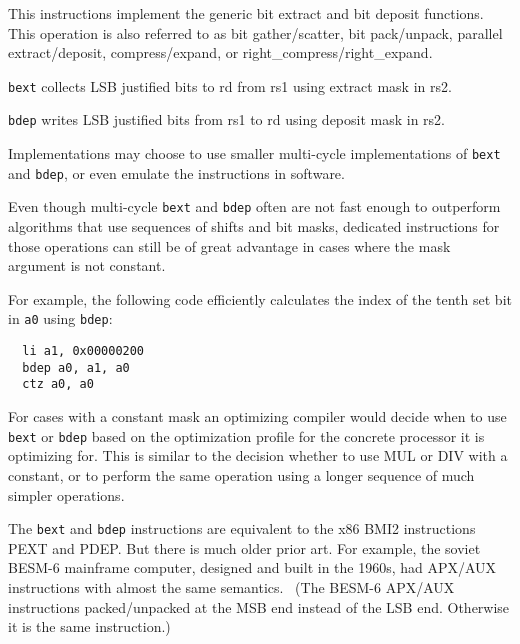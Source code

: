 This instructions implement the generic bit extract and bit deposit functions.
This operation is also referred to as bit gather/scatter, bit pack/unpack,
parallel extract/deposit, compress/expand, or right\_compress/right\_expand.

\texttt{bext} collects LSB justified bits to rd from rs1 using extract mask in rs2.

\texttt{bdep} writes LSB justified bits from rs1 to rd using deposit mask in rs2.



Implementations may choose to use smaller multi-cycle implementations of
\texttt{bext} and \texttt{bdep}, or even emulate the instructions in software.

Even though multi-cycle \texttt{bext} and \texttt{bdep} often are not fast
enough to outperform algorithms that use sequences of shifts and bit masks,
dedicated instructions for those operations can still be of great advantage in
cases where the mask argument is not constant.

For example, the following code efficiently calculates the index of the tenth
set bit in {\tt a0} using \texttt{bdep}:

\begin{minipage}{\linewidth}
\begin{verbatim}
  li a1, 0x00000200
  bdep a0, a1, a0
  ctz a0, a0
\end{verbatim}
\end{minipage}

For cases with a constant mask an optimizing compiler would decide when to use
\texttt{bext} or \texttt{bdep} based on the optimization profile for the
concrete processor it is optimizing for. This is similar to the decision
whether to use MUL or DIV with a constant, or to perform the same operation
using a longer sequence of much simpler operations.

The \texttt{bext} and \texttt{bdep} instructions are equivalent to the x86 BMI2
instructions PEXT and PDEP. But there is much older prior art. For example, the
soviet BESM-6 mainframe computer, designed and built in the 1960s, had APX/AUX
instructions with almost the same semantics.~\cite{BESM6} (The BESM-6 APX/AUX
instructions packed/unpacked at the MSB end instead of the LSB end. Otherwise
it is the same instruction.)

%
%
%
%
%
%
%
%


